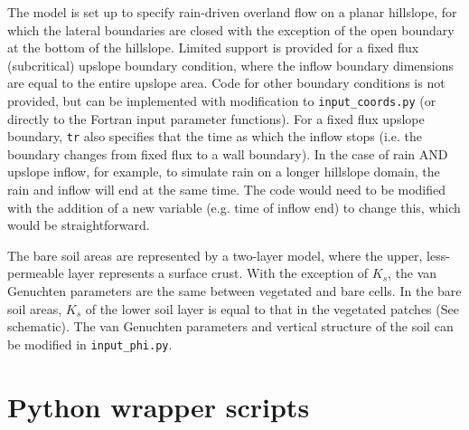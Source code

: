 \documentclass{article}
\newcommand{\code}[1]{\texttt{#1}}
\begin{document}
The model is set up to specify rain-driven overland flow on a planar hillslope, for which the lateral boundaries are closed with the exception of the open boundary at the bottom of the hillslope.  Limited support is provided for a fixed flux (subcritical) upslope boundary condition,  where the inflow boundary dimensions are equal to the entire upslope area.  Code for other boundary conditions is not provided, but can be implemented with modification to \code{input\_coords.py} (or directly to the Fortran input parameter functions).
For a fixed flux upslope boundary, \code{tr} also specifies that the time as which the inflow stops (i.e. the boundary changes from fixed flux to a wall boundary).  In the case of rain AND upslope inflow, for example, to simulate rain on a longer hillslope domain, the rain and inflow will end at the same time. The code would need to be modified with the addition of a new variable (e.g. time of inflow end) to change this, which would be straightforward. 

The bare soil areas are represented by a two-layer model, where the upper, less-permeable  layer represents a surface crust.  With the exception of $K_{s}$, the van Genuchten parameters are the same between vegetated and bare cells. In the bare soil areas, $K_{s}$ of the lower soil layer is  equal to that in the vegetated patches (See schematic).
The van Genuchten parameters and vertical structure of the soil can be modified in \code{input\_phi.py}.


\section{Python wrapper scripts}



%
%
\end{document}
